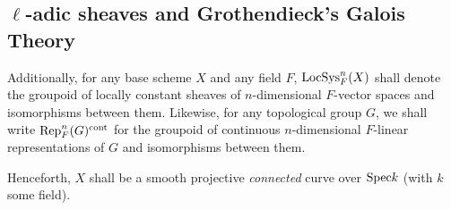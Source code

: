     \subsection{\texorpdfstring{$\ell$}{}-adic sheaves and Grothendieck's Galois Theory}
        \begin{convention}
            Additionally, for any base scheme $X$ and any field $F$, $\mathrm{LocSys}^n_F(X)$ shall denote the groupoid of locally constant sheaves of $n$-dimensional $F$-vector spaces and isomorphisms between them. Likewise, for any topological group $G$, we shall write $\mathrm{Rep}_F^n(G)^{\mathrm{cont}}$ for the groupoid of continuous $n$-dimensional $F$-linear representations of $G$ and isomorphisms between them. 
        \end{convention}
        \begin{convention} \label{conv: base_curve}
            Henceforth, $X$ shall be a smooth projective \textit{connected} curve over $\mathrm{Spec} k$ (with $k$ some field).
        \end{convention}
        
